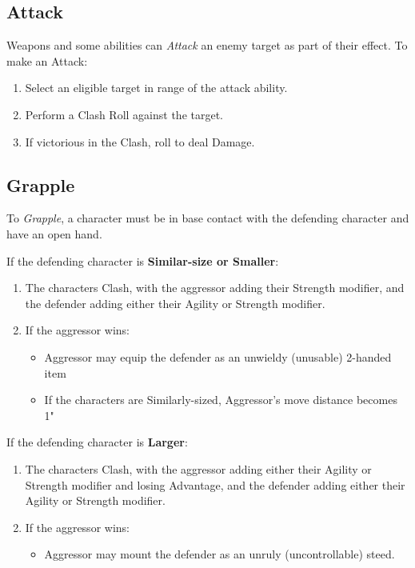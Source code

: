 \newpage

\subsection{Attack}
Weapons and some abilities can \textit{Attack} an enemy target as part of their effect.
To make an Attack:

\begin{enumerate}
  \item Select an eligible target in range of the attack ability.
  \item Perform a Clash Roll against the target.
  \item If victorious in the Clash, roll to deal Damage.
\end{enumerate}


\subsection{Grapple}
To \textit{Grapple}, a character must be in base contact 
with the defending character and have an open hand.

\vspace{0.4em}

If the defending character is \textbf{Similar-size or Smaller}:
\begin{enumerate}
  \item The characters Clash, with the aggressor adding their 
  Strength modifier, 
  and the defender adding either their Agility or Strength modifier.
  \item If the aggressor wins:
    \begin{itemize}
      \item Aggressor may equip the defender as an unwieldy 
      (unusable) 2-handed item
      \item If the characters are Similarly-sized, 
      Aggressor's move distance becomes 1"
    \end{itemize}
\end{enumerate}

If the defending character is \textbf{Larger}:
\begin{enumerate}
  \item The characters Clash, 
  with the aggressor adding either their Agility or Strength modifier 
  and losing Advantage, 
  and the defender adding either their Agility or Strength modifier.
  \item If the aggressor wins:
    \begin{itemize}
      \item Aggressor may mount the defender as an unruly 
      (uncontrollable) steed.
    \end{itemize}
\end{enumerate}

